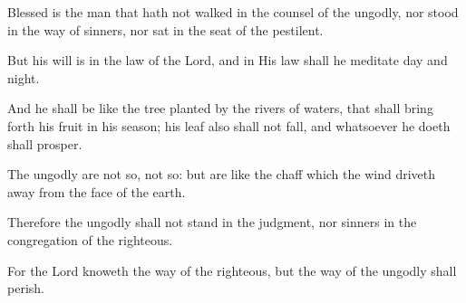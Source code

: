 Blessed is the man that hath not walked in the counsel of the ungodly, nor stood in the way of sinners, nor sat in the seat of the pestilent.

But his will is in the law of the Lord, and in His law shall he meditate day and night.

And he shall be like the tree planted by the rivers of waters, that shall bring forth his fruit in his season; his leaf also shall not fall, and whatsoever he doeth shall prosper.

The ungodly are not so, not so: but are like the chaff which the wind driveth away from the face of the earth.

Therefore the ungodly shall not stand in the judgment, nor sinners in the congregation of the righteous.

For the Lord knoweth the way of the righteous, but the way of the ungodly shall perish.
